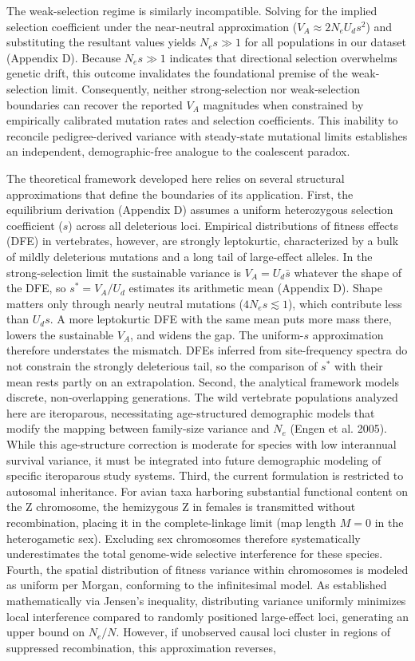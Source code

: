 \documentclass[12pt]{article}
\begin{document}
The weak-selection regime is similarly incompatible. Solving for the implied selection coefficient under the near-neutral approximation ($V_A \approx 2N_e U_d s^2$) and substituting the resultant values yields $N_e s \gg 1$ for all populations in our dataset (Appendix D). Because $N_e s \gg 1$ indicates that directional selection overwhelms genetic drift, this outcome invalidates the foundational premise of the weak-selection limit. Consequently, neither strong-selection nor weak-selection boundaries can recover the reported $V_A$ magnitudes when constrained by empirically calibrated mutation rates and selection coefficients. This inability to reconcile pedigree-derived variance with steady-state mutational limits establishes an independent, demographic-free analogue to the coalescent paradox.

The theoretical framework developed here relies on several structural approximations that define the boundaries of its application. First, the equilibrium derivation (Appendix D) assumes a uniform heterozygous selection coefficient ($s$) across all deleterious loci. Empirical distributions of fitness effects (DFE) in vertebrates, however, are strongly leptokurtic, characterized by a bulk of mildly deleterious mutations and a long tail of large-effect alleles. In the strong-selection limit the sustainable variance is $V_A = U_d\bar{s}$ whatever the shape of the DFE, so $s^* = V_A/U_d$ estimates its arithmetic mean (Appendix D). Shape matters only through nearly neutral mutations ($4N_es \lesssim 1$), which contribute less than $U_ds$. A more leptokurtic DFE with the same mean puts more mass there, lowers the sustainable $V_A$, and widens the gap. The uniform-$s$ approximation therefore understates the mismatch. DFEs inferred from site-frequency spectra do not constrain the strongly deleterious tail, so the comparison of $s^*$ with their mean rests partly on an extrapolation. Second, the analytical framework models discrete, non-overlapping generations. The wild vertebrate populations analyzed here are iteroparous, necessitating age-structured demographic models that modify the mapping between family-size variance and $N_e$ (Engen et al. 2005). While this age-structure correction is moderate for species with low interannual survival variance, it must be integrated into future demographic modeling of specific iteroparous study systems. Third, the current formulation is restricted to autosomal inheritance. For avian taxa harboring substantial functional content on the Z chromosome, the hemizygous Z in females is transmitted without recombination, placing it in the complete-linkage limit (map length $M = 0$ in the heterogametic sex). Excluding sex chromosomes therefore systematically underestimates the total genome-wide selective interference for these species. Fourth, the spatial distribution of fitness variance within chromosomes is modeled as uniform per Morgan, conforming to the infinitesimal model. As established mathematically via Jensen’s inequality, distributing variance uniformly minimizes local interference compared to randomly positioned large-effect loci, generating an upper bound on $N_e/N$. However, if unobserved causal loci cluster in regions of suppressed recombination, this approximation reverses, 
\end{document}
